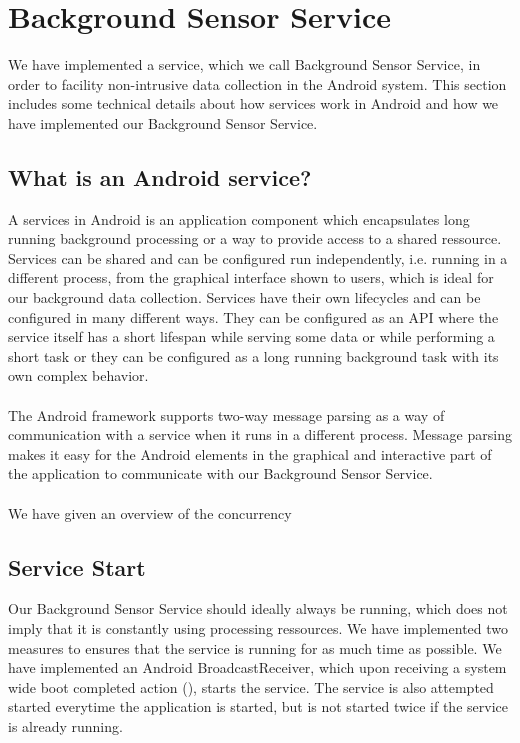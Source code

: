 
\section{Background Sensor Service}
\label{sec:background_sensor_service}
We have implemented a service, which we call Background Sensor Service, in order to facility non-intrusive data collection in the Android system.
This section includes some technical details about how services work in Android and how we have implemented our Background Sensor Service. 

\subsection{What is an Android service?}
A services in Android is an application component which encapsulates long running background processing or a way to provide access to a shared ressource. Services can be shared and can be configured run independently, i.e. running in a different process, from the graphical interface shown to users, which is ideal for our background data collection. Services have their own lifecycles and can be configured in many different ways. They can be configured as an API where the service itself has a short lifespan while serving some data or while performing a short task or they can be configured as a long running background task with its own complex behavior.
\\\\
The Android framework supports two-way message parsing as a way of communication with a service when it runs in a different process. Message parsing makes it easy for the Android  elements in the graphical and interactive part of the application to communicate with our Background Sensor Service.
\\\\
We have given an overview of the concurrency 

\subsection{Service Start}
Our Background Sensor Service should ideally always be running, which does not imply that it is constantly using processing ressources. We have implemented two measures to ensures that the service is running for as much time as possible. We have implemented an Android BroadcastReceiver, which upon receiving a system wide boot completed action (), starts the service. The service is also attempted started everytime the application is started, but is not started twice if the service is already running. 

